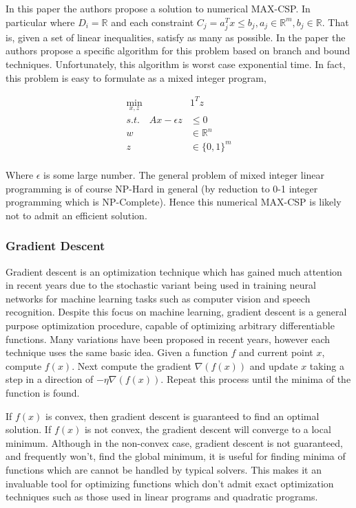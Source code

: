 \documentclass[a4paper]{article}
\begin{document}
In this paper the authors propose a solution to numerical MAX-CSP. In particular where 
$D_i = \mathds{R}$ and each constraint $C_j = a_j^Tx \leq b_j, a_j \in \mathds{R}^m, b_j \in \mathds{R}$. 
That is, given a set of linear inequalities, satisfy as many as possible. In the paper the authors 
propose a specific algorithm for this problem based on branch and bound techniques. Unfortunately, 
this algorithm is worst case exponential time. In fact, this problem is easy to formulate as a mixed integer 
program,

\begin{align*}
\min_{x,z}\quad &1^Tz\\
s.t. \quad Ax - \epsilon z &\leq 0\\
		w &\in \mathds{R}^n\\
		z &\in \{0,1\}^m\\
\end{align*}

Where $\epsilon$ is some large number. The general problem of mixed integer linear programming is 
of course NP-Hard in general (by reduction to 0-1 integer programming which is NP-Complete). Hence 
this numerical MAX-CSP is likely not to admit an efficient solution. 

\subsubsection{Gradient Descent}


Gradient descent is an optimization technique which has gained much 
attention in recent years due to the stochastic variant being used in training neural networks for machine learning 
tasks such as computer vision and speech recognition. Despite this focus on machine learning,
gradient descent is a general purpose optimization procedure, capable of optimizing arbitrary 
differentiable functions. Many variations have been proposed in recent years, however
each technique uses the same basic idea. Given a function $f$ and current point $x$, compute $f(x)$. 
Next compute the gradient $\nabla(f(x))$ and update $x$ taking a step in a direction of $-\eta \nabla(f(x))$. Repeat this 
process until the minima of the function is found. 

If $f(x)$ is convex, then gradient descent is guaranteed to find an optimal solution. If $f(x)$ is not convex, 
the gradient descent will converge to a local minimum. Although in the non-convex case, gradient descent 
is not guaranteed, and frequently won't, find the global minimum, it is useful for finding 
minima of functions which are cannot be handled by typical solvers.  This makes it an invaluable tool for 
optimizing functions which don't admit exact optimization techniques such as those used in 
linear programs and quadratic programs.
\end{document}
